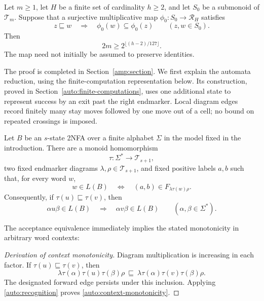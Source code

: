 \begin{theorem}
\label{amp:image}
\label{amp:relation-bound}
Let $m\geq1$, let $H$ be a finite set of cardinality $h\geq2$, and let
$S_0$ be a submonoid of $\mathcal T_m$.  Suppose that a surjective
multiplicative map $\phi_0:S_0\to\mathcal R_H$ satisfies
\begin{equation}
 z\sqsubseteq w\quad\Longrightarrow\quad
 \phi_0(w)\subseteq\phi_0(z)
 \qquad(z,w\in S_0).
 \label{amp:reverse}
\end{equation}
Then
\begin{equation}
 2m\geq 2^{\lfloor(h-2)/127\rfloor}.
 \label{amp:bound}
\end{equation}
The map need not initially be assumed to preserve identities.
\end{theorem}

The proof is completed in Section~\ref{amp:section}. We first explain
the automata reduction, using the finite-computation representation
below. Its construction, proved in
Section~\ref{auto:finite-computations}, uses one additional state to
represent success by an exit past the right endmarker. Local diagram
edges record finitely many stay moves followed by one move out of a
cell; no bound on repeated crossings is imposed.

\begin{lemma}\label{auto:representation}
Let $B$ be an $s$-state 2NFA over a finite alphabet $\Sigma$ in the model
fixed in the introduction. There are a monoid homomorphism
\[
  \tau:\Sigma^*\longrightarrow\mathcal T_{s+1},
\]
two fixed endmarker diagrams $\lambda,\rho\in\mathcal T_{s+1}$,
and fixed positive labels $a,b$ such that, for every word $w$,
\begin{equation}\label{auto:recognition}
  w\in L(B)
  \quad\Longleftrightarrow\quad
  (a,b)\in F_{\lambda\tau(w)\rho}.
\end{equation}
Consequently, if $\tau(u)\sqsubseteq\tau(v)$, then
\begin{equation}\label{auto:context-monotonicity}
  \alpha u\beta\in L(B)
  \quad\Longrightarrow\quad
  \alpha v\beta\in L(B)
  \qquad(\alpha,\beta\in\Sigma^*).
\end{equation}
\end{lemma}
The acceptance equivalence immediately implies the stated monotonicity
in arbitrary word contexts:
\begin{proof}[Derivation of context monotonicity]
Diagram multiplication is increasing in each factor.
If $\tau(u)\sqsubseteq\tau(v)$, then
\[
 \lambda\tau(\alpha)\tau(u)\tau(\beta)\rho
 \ \sqsubseteq\
 \lambda\tau(\alpha)\tau(v)\tau(\beta)\rho.
\]
The designated forward edge persists under this inclusion.  Applying
\eqref{auto:recognition} proves
\eqref{auto:context-monotonicity}.
\end{proof}

